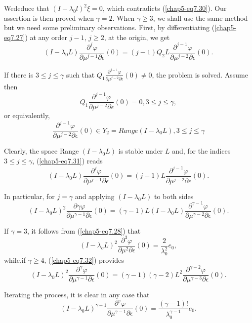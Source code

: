 We\pageoriginale deduce that $(I - \lambda_{0} l)^{2} \xi = 0$, which
contradicts (\ref{chap5-eq7.30}). Our assertion is then proved when
$\gamma = 2$. When $\gamma \geq 3$, we shall use the same method but
we need some preliminary observations. First, by differentiating
(\ref{chap5-eq7.27}) at any order $j - 1$, $j \geq 2$, at the origin,
we get
\begin{equation*}
(I - \lambda_{0}L) \frac{\partial^{j} \varphi}{\partial \mu^{j-1}
    \partial \epsilon} (0) = (j-1)Q_{2}L
  \frac{\partial^{j-1}\varphi}{\partial \mu^{j-2} \partial \epsilon}
  (0).\tag{7.31}\label{chap5-eq7.31} 
\end{equation*}

If there is $3 \leq j \leq \gamma$ such that $Q_{1}
\frac{\partial^{j-1} \varphi}{\partial \mu^{j-2} \partial \epsilon}
(0) \neq 0$, the problem is solved. Assume then
$$
Q_{1} \frac{\partial^{j-1} \varphi}{\partial \mu^{j-2} \partial
  \epsilon} (0) = 0, 3 \leq j \leq \gamma,
$$
or equivalently,
$$ 
\frac{\partial^{j-1} \varphi}{\partial \mu^{j-2} \partial \epsilon}
(0) \in Y_{2} = Range (I - \lambda_{0}L), 3 \leq j \leq \gamma
$$

Clearly, the space Range $(I - \lambda_{0}L)$ is stable under $L$ and,
for the indices $3 \leq j \leq \gamma$, (\ref{chap5-eq7.31}) reads
\begin{equation*}
(I - \lambda_{0}L) \frac{\partial^{j} \varphi}{\partial \mu^{j-1}
    \partial \epsilon} (0) = (j - 1)L \frac{\partial^{j-1}
    \varphi}{\partial \mu^{j-2} \partial \epsilon}
  (0).\tag{7.32}\label{chap5-eq7.32} 
\end{equation*}

In particular, for $j = \gamma$ and applying $(I - \lambda_{0}L)$ to
both sides 
$$
(I - \lambda_{0} L)^{2} \frac{\partial \gamma \varphi}{\partial
  \mu^{\gamma - 1}\partial \epsilon} (0) = (\gamma - 1) L(I -
\lambda_{0}L) \frac{\partial^{\gamma - 1} \varphi}{\partial
  \mu^{\gamma - 2} \partial \epsilon} (0).
$$

If $\gamma = 3$, it follows from (\ref{chap5-eq7.28}) that
$$
(I - \lambda_{o} L)^{2} \frac{\partial^{3} \varphi}{\partial \mu^{2}
  \partial \epsilon} (0) = \frac{2}{\lambda_{0}^{2}} e_{0},
$$
while,\pageoriginale if $\gamma \geq 4$, (\ref{chap5-eq7.32}) provides
$$
(I - \lambda_{0}L)^{2} \frac{\partial^{\gamma} \varphi}{\partial
  \mu^{\gamma - 1} \partial \epsilon} (0) = (\gamma - 1)(\gamma -
2)L^{2} \frac{\partial^{\gamma - 2}\varphi}{\partial \mu^{\gamma - 3}
  \partial \epsilon} (0).
$$

Iterating the process, it is clear in any case that
\begin{equation*}
(I - \lambda_{0}L)^{\gamma - 1}
  \frac{\partial^{\gamma}\varphi}{\partial \mu^{\gamma - 1} \partial
    \epsilon} (0) = \frac{(\gamma - 1)!}{\lambda_{0}^{\gamma - 1}}
  e_{0}.\tag{7.33}\label{chap5-eq7.33} 
\end{equation*}

